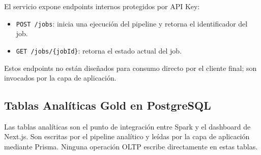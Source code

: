 El servicio expone endpoints internos protegidos por API Key:

\begin{itemize}[leftmargin=1.5em]
  \item \texttt{POST /jobs}: inicia una ejecución del pipeline y retorna el identificador del job.
  \item \texttt{GET /jobs/\{jobId\}}: retorna el estado actual del job.
\end{itemize}

Estos endpoints no están diseñados para consumo directo por el cliente final; son invocados
por la capa de aplicación.

\subsection{Tablas Analíticas Gold en PostgreSQL}

Las tablas analíticas son el punto de integración entre Spark y el dashboard de Next.js.
Son escritas por el pipeline analítico y leídas por la capa de aplicación mediante Prisma.
Ninguna operación OLTP escribe directamente en estas tablas.

